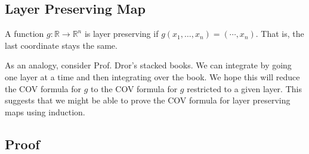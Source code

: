 \documentclass{article}
\numberwithin{equation}{section}
\begin{document}
\subsection{Layer Preserving Map}
\begin{definition}
    A function $g:\mathbb{R}\to\mathbb{R}^n$ is layer preserving if $g\left(x_1,\dots,x_n\right)=\left(\cdots,x_n\right).$ That is, the last coordinate stays the same.
\end{definition}
As an analogy, consider Prof. Dror's stacked books. We can integrate by going one layer at a time and then integrating over the book. We hope this will reduce the COV formula for $g$ to the COV formula for $g$ restricted to a given layer. This suggests that we might be able to prove the COV formula for layer preserving maps using induction.
\subsection{Proof}
\end{document}
